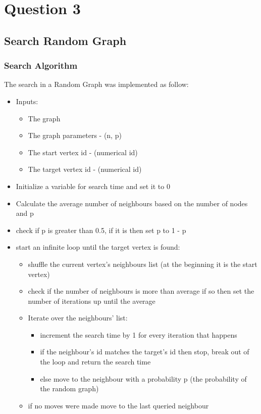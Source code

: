 \documentclass[11pt,a4paper,notitlepage]{article}
\begin{document}
\section*{Question 3}
\subsection*{Search Random Graph}
\subsubsection*{Search Algorithm}
The search in a Random Graph was implemented as follow:
\begin{itemize}
    \item Inputs:
    \begin{itemize}
        \item The graph
        \item The graph parameters - (n, p)
        \item The start vertex id - (numerical id)
        \item The target vertex id - (numerical id)
    \end{itemize}
    \item Initialize a variable for search time and set it to 0
    \item Calculate the average number of neighbours based on the number of nodes and p
    \item check if p is greater than 0.5, if it is then set p to 1 - p
    \item start an infinite loop until the target vertex is found:
    \begin{itemize}
        \item shuffle the current vertex's neighbours list (at the beginning it is the start vertex)
        \item check if the number of neighbours is more than average if so then set the number of iterations up until the average
        \item Iterate over the neighbours' list:
        \begin{itemize}
            \item increment the search time by 1 for every iteration that happens
            \item if the neighbour's id matches the target's id then stop, break out of the loop and return the search time
            \item else move to the neighbour with a probability p (the probability of the random graph)
        \end{itemize}
        \item if no moves were made move to the last queried neighbour
    \end{itemize}
\end{itemize}
\end{document}
